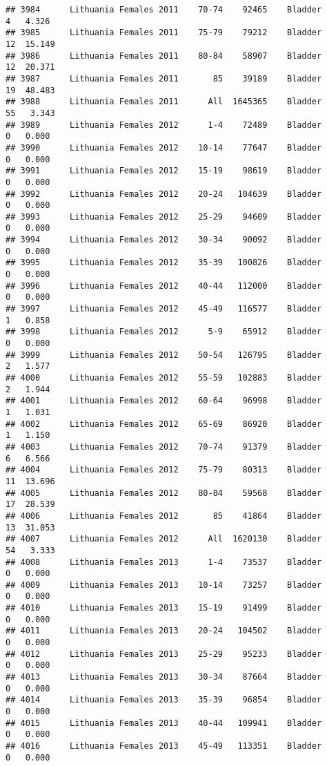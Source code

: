 \documentclass[
]{article}
\begin{document}
\begin{verbatim}
## 3984      Lithuania Females 2011    70-74    92465    Bladder      4   4.326
## 3985      Lithuania Females 2011    75-79    79212    Bladder     12  15.149
## 3986      Lithuania Females 2011    80-84    58907    Bladder     12  20.371
## 3987      Lithuania Females 2011       85    39189    Bladder     19  48.483
## 3988      Lithuania Females 2011      All  1645365    Bladder     55   3.343
## 3989      Lithuania Females 2012      1-4    72489    Bladder      0   0.000
## 3990      Lithuania Females 2012    10-14    77647    Bladder      0   0.000
## 3991      Lithuania Females 2012    15-19    98619    Bladder      0   0.000
## 3992      Lithuania Females 2012    20-24   104639    Bladder      0   0.000
## 3993      Lithuania Females 2012    25-29    94609    Bladder      0   0.000
## 3994      Lithuania Females 2012    30-34    90092    Bladder      0   0.000
## 3995      Lithuania Females 2012    35-39   100826    Bladder      0   0.000
## 3996      Lithuania Females 2012    40-44   112000    Bladder      0   0.000
## 3997      Lithuania Females 2012    45-49   116577    Bladder      1   0.858
## 3998      Lithuania Females 2012      5-9    65912    Bladder      0   0.000
## 3999      Lithuania Females 2012    50-54   126795    Bladder      2   1.577
## 4000      Lithuania Females 2012    55-59   102883    Bladder      2   1.944
## 4001      Lithuania Females 2012    60-64    96998    Bladder      1   1.031
## 4002      Lithuania Females 2012    65-69    86920    Bladder      1   1.150
## 4003      Lithuania Females 2012    70-74    91379    Bladder      6   6.566
## 4004      Lithuania Females 2012    75-79    80313    Bladder     11  13.696
## 4005      Lithuania Females 2012    80-84    59568    Bladder     17  28.539
## 4006      Lithuania Females 2012       85    41864    Bladder     13  31.053
## 4007      Lithuania Females 2012      All  1620130    Bladder     54   3.333
## 4008      Lithuania Females 2013      1-4    73537    Bladder      0   0.000
## 4009      Lithuania Females 2013    10-14    73257    Bladder      0   0.000
## 4010      Lithuania Females 2013    15-19    91499    Bladder      0   0.000
## 4011      Lithuania Females 2013    20-24   104502    Bladder      0   0.000
## 4012      Lithuania Females 2013    25-29    95233    Bladder      0   0.000
## 4013      Lithuania Females 2013    30-34    87664    Bladder      0   0.000
## 4014      Lithuania Females 2013    35-39    96854    Bladder      0   0.000
## 4015      Lithuania Females 2013    40-44   109941    Bladder      0   0.000
## 4016      Lithuania Females 2013    45-49   113351    Bladder      0   0.000

\end{verbatim}
\end{document}
